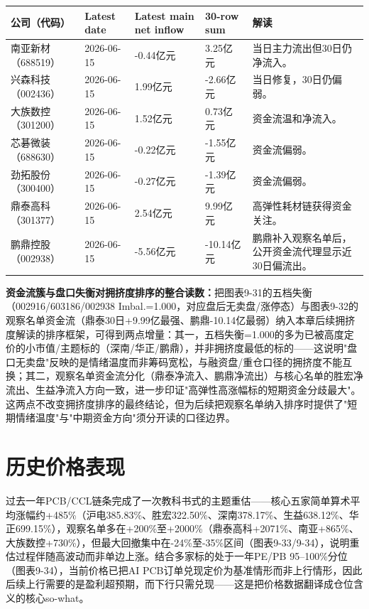 \begin{exhibitbox}
\footnotesize
\begin{tabularx}{\textwidth}{L{1.8cm}R{2.0cm}R{2.2cm}R{2.0cm}X}
\toprule
\textbf{公司（代码）} & \textbf{Latest date} & \textbf{Latest main net inflow} & \textbf{30-row sum} & \textbf{解读} \\
\midrule
南亚新材（688519） & 2026-06-15 & -0.44亿元 & 3.25亿元 & 当日主力流出但30日仍净流入。 \\
兴森科技（002436） & 2026-06-15 & 1.99亿元 & -2.66亿元 & 当日修复，30日仍偏弱。 \\
大族数控（301200） & 2026-06-15 & 1.52亿元 & 0.73亿元 & 资金流温和净流入。 \\
芯碁微装（688630） & 2026-06-15 & -0.22亿元 & -1.55亿元 & 资金流偏弱。 \\
劲拓股份（300400） & 2026-06-15 & -0.27亿元 & -1.39亿元 & 资金流偏弱。 \\
鼎泰高科（301377） & 2026-06-15 & 2.54亿元 & 9.99亿元 & 高弹性耗材链获得资金关注。 \\
鹏鼎控股（002938） & 2026-06-15 & -5.56亿元 & -10.14亿元 & 鹏鼎补入观察名单后，公开资金流代理显示近30日偏流出。 \\
\bottomrule
\end{tabularx}
\end{exhibitbox}

\textbf{资金流簇与盘口失衡对拥挤度排序的整合读数：}把图表9-31的五档失衡（002916/603186/002938 Imbal.=1.000，对应盘后无卖盘/涨停态）与图表9-32的观察名单资金流（鼎泰30日+9.99亿最强、鹏鼎-10.14亿最弱）纳入本章后续拥挤度解读的排序框架，可得到两点增量：其一，五档失衡=1.000的多为已被高度定价的小市值/主题标的（深南/华正/鹏鼎），并非拥挤度最低的标的——这说明"盘口无卖盘"反映的是情绪温度而非筹码宽松，与融资盘/重仓口径的拥挤度不能互换；其二，观察名单资金流分化（鼎泰净流入、鹏鼎净流出）与核心名单的胜宏净流出、生益净流入方向一致，进一步印证"高弹性高涨幅标的短期资金分歧最大"。这两点不改变拥挤度排序的最终结论，但为后续把观察名单纳入排序时提供了"短期情绪温度"与"中期资金方向"须分开读的口径边界。

\section{历史价格表现}

过去一年PCB/CCL链条完成了一次教科书式的主题重估——核心五家简单算术平均涨幅约+485\%（沪电385.83\%、胜宏322.50\%、深南378.17\%、生益638.12\%、华正699.15\%），观察名单多在+200\%至+2000\%（鼎泰高科+2071\%、南亚+865\%、大族数控+730\%），但最大回撤集中在-24\%至-35\%区间（图表9-33/9-34），说明重估过程伴随高波动而非单边上涨。结合多家标的处于一年PE/PB 95–100\%分位（图表9-34），当前价格已把AI PCB订单兑现定价为基准情形而非上行情形，因此后续上行需要的是盈利超预期，而下行只需兑现——这是把价格数据翻译成仓位含义的核心so-what。

